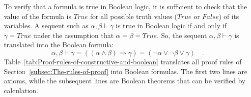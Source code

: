 To verify that a formula is true in Boolean logic, it is sufficient
 to check that the value of the formula is $True$ for all possible
truth values ($True$ or $False$) of its variables. A sequent such
as $\alpha,\beta\vdash\gamma$ is true in Boolean logic if and only
if $\gamma=True$ under the assumption that $\alpha=\beta=True$.
So, the sequent $\alpha,\beta\vdash\gamma$ is translated into the
Boolean formula:
\[
\alpha,\beta\vdash\gamma=\left(\left(\alpha\wedge\beta\right)\Rightarrow\gamma\right)=\left(\neg\alpha\vee\neg\beta\vee\gamma\right)\quad.
\]
Table~\ref{tab:Proof-rules-of-constructive-and-boolean} translates
all proof rules of Section~\ref{subsec:The-rules-of-proof} into
Boolean formulas. The first two lines are axioms, while the subsequent
lines are Boolean theorems that can be verified by calculation.

